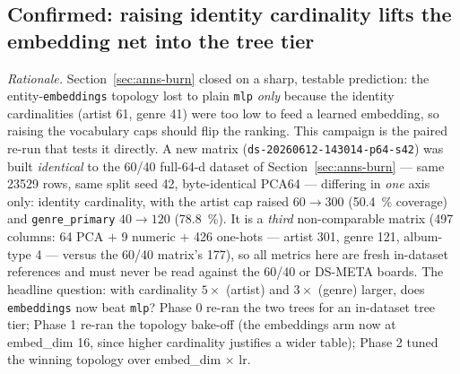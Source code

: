 \documentclass[11pt]{article}
\newcommand{\dsid}[1]{\texttt{\small #1}}
\begin{document}
\subsection{Confirmed: raising identity cardinality lifts the embedding net into the tree tier}
\label{sec:anns-highvocab}
\emph{Rationale.} Section~\ref{sec:anns-burn} closed on a sharp, testable
prediction: the entity-\texttt{embeddings} topology lost to plain \texttt{mlp}
\emph{only} because the identity cardinalities (artist 61, genre 41) were too
low to feed a learned embedding, so raising the vocabulary caps should flip the
ranking. This campaign is the paired re-run that tests it directly. A new matrix
(\dsid{ds-20260612-143014-p64-s42}) was built \emph{identical} to the 60/40
full-64-d dataset of Section~\ref{sec:anns-burn} --- same \num{23529} rows, same
split seed 42, byte-identical PCA64 --- differing in \emph{one} axis only:
identity cardinality, with the artist cap raised $60\to300$
(\SI{50.4}{\percent} coverage) and \texttt{genre\_primary} $40\to120$
(\SI{78.8}{\percent}). It is a \emph{third} non-comparable matrix (497 columns:
64 PCA $+$ 9 numeric $+$ 426 one-hots --- artist 301, genre 121, album-type 4 ---
versus the 60/40 matrix's 177), so all metrics here are fresh in-dataset
references and must never be read against the 60/40 or DS-META boards. The
headline question: with cardinality $5\times$ (artist) and $3\times$ (genre)
larger, does \texttt{embeddings} now beat \texttt{mlp}? Phase 0 re-ran the two
trees for an in-dataset tree tier; Phase 1 re-ran the topology bake-off (the
embeddings arm now at embed\_dim 16, since higher cardinality justifies a wider
table); Phase 2 tuned the winning topology over embed\_dim $\times$ lr.
\end{document}

